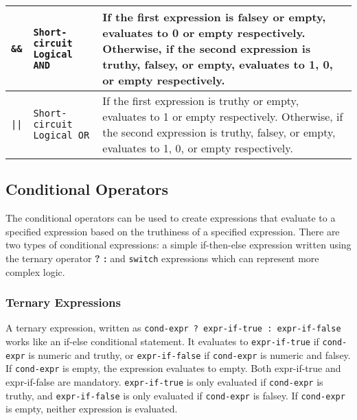 \begin{table}[H]
\begin{tabular}{ |p{2cm}|p{5cm}|p{7cm}|  }
			\rule{0pt}{3ex}\texttt{\&\&} & \texttt{Short-circuit Logical AND} & {If the first expression is falsey or empty, evaluates to 0 or empty respectively. Otherwise, if the second expression is truthy, falsey, or empty, evaluates to 1, 0, or empty respectively.} \\ \hline
			\rule{0pt}{3ex}\texttt{||} & \texttt{Short-circuit Logical OR} & {If the first expression is truthy or empty, evaluates to 1 or empty respectively. Otherwise, if the second expression is truthy, falsey, or empty, evaluates to 1, 0, or empty respectively.} \\ \hline
			\end{tabular}
			\end{table}
		\subsection{Conditional Operators}
			The conditional operators can be used to create expressions that evaluate to a specified expression based on the truthiness of a specified expression. There are two types of conditional expressions: a simple if-then-else expression written using the ternary operator \textbf{? :} and \texttt{switch} expressions which can represent more complex logic.

\subsubsection{Ternary Expressions}
\label{sec:Ternary}
A ternary expression, written as \texttt{cond-expr ? expr-if-true : expr-if-false} works like an if-else conditional statement. It evaluates to \texttt{expr-if-true} if \texttt{cond-expr} is numeric and truthy, or  \texttt{expr-if-false} if \texttt{cond-expr} is numeric and falsey. If \texttt{cond-expr} is empty, the expression evaluates to empty. Both expr-if-true and expr-if-false are mandatory. \texttt{expr-if-true} is only evaluated if \texttt{cond-expr} is truthy, and \texttt{expr-if-false} is only evaluated if \texttt{cond-expr} is falsey. If \texttt{cond-expr} is empty, neither expression is evaluated.

